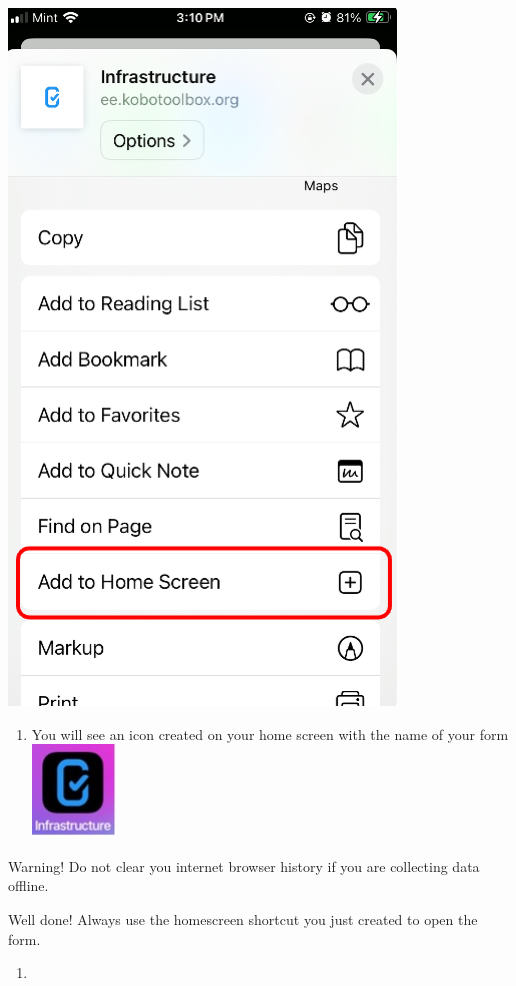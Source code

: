 \documentclass[
  letterpaper,
  DIV=11,
  numbers=noendperiod]{scrartcl}
\providecommand{\tightlist}{%
  \setlength{\itemsep}{0pt}\setlength{\parskip}{0pt}}\usepackage{longtable,booktabs,array}
\begin{document}
\includegraphics{kobotoolbox_tutorial_files/img/img21.png}

\begin{enumerate}
\def\labelenumi{\arabic{enumi}.}
\setcounter{enumi}{3}
\tightlist
\item
  You will see an icon created on your home screen with the name of your
  form \includegraphics{kobotoolbox_tutorial_files/img/img22.jpg}
\end{enumerate}

Warning! Do not clear you internet browser history if you are collecting
data offline.

Well done! Always use the homescreen shortcut you just created to open
the form.

\begin{enumerate}
\def\labelenumi{\arabic{enumi}.}
\setcounter{enumi}{4}
\tightlist
\item
\end{enumerate}
\end{document}
